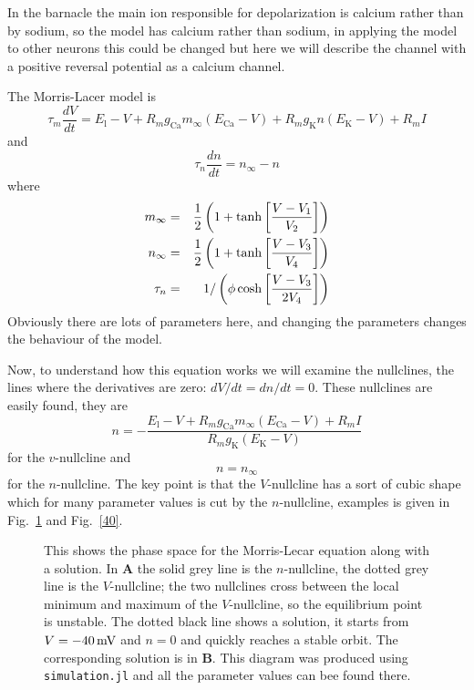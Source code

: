 \documentclass[11pt,a4paper]{scrartcl}
\newcommand{\mV}{\mbox{\,mV}}
\begin{document}
In the barnacle the main ion responsible for depolarization is calcium
rather than by sodium, so the model has calcium rather than sodium, in
applying the model to other neurons this could be changed but here we
will describe the channel with a positive reversal potential as a
calcium channel.

The Morris-Lacer model is
\begin{equation}
\tau_m\frac{dV}{dt}=E_{\text{l}}-V+R_mg_{\text{Ca}}m_\infty(E_{\text{Ca}} -V)+R_mg_{\text{K}}n(E_{\text{K}} -V)+R_mI
\end{equation}
and
\begin{equation}
\tau_n\frac{dn}{dt}=n_\infty-n
\end{equation}
where
\begin{eqnarray}
m_\infty&=&\frac{1}{2}\left(1+\tanh\left[\frac{V-V_1}{V_2}\right]\right)\cr
n_\infty&=&\frac{1}{2}\left(1+\tanh\left[\frac{V-V_3}{V_4}\right]\right)\cr
\tau_n&=&1/\left(\phi\cosh\left[\frac{V-V_3}{2V_4}\right]\right)
\end{eqnarray}
Obviously there are lots of parameters here, and changing the
parameters changes the behaviour of the model.

Now, to understand how this equation works we will examine the
nullclines, the lines where the derivatives are zero:
$dV/dt=dn/dt=0$. These nullclines are easily found, they are
\begin{equation}
n=-\frac{E_{\text{l}}-V+R_mg_{\text{Ca}}m_\infty(E_{\text{Ca}} -V)+R_mI}{R_mg_{\text{K}}(E_{\text{K}} -V)}
\end{equation}
for the $v$-nullcline and 
\begin{equation}
n=n_\infty
\end{equation}
for the $n$-nullcline. The key point is that the $V$-nullcline has a
sort of cubic shape which for many parameter values is cut by the
$n$-nullcline, examples is given in Fig.~\ref{60} and Fig.~\ref{40}.

\begin{figure}
\begin{center}
  
\end{center}
\caption{This shows the phase space for the Morris-Lecar equation
  along with a solution. In \textbf{A} the solid grey line is the
  $n$-nullcline, the dotted grey line is the $V$-nullcline; the two
  nullclines cross between the local minimum and maximum of the
  $V$-nullcline, so the equilibrium point is unstable. The dotted
  black line shows a solution, it starts from $V=-40\mV$ and $n=0$ and
  quickly reaches a stable orbit. The corresponding solution is in
  \textbf{B}. This diagram was produced using \texttt{simulation.jl}
  and all the parameter values can bee found there. \label{60}}
\end{figure}
\end{document}
